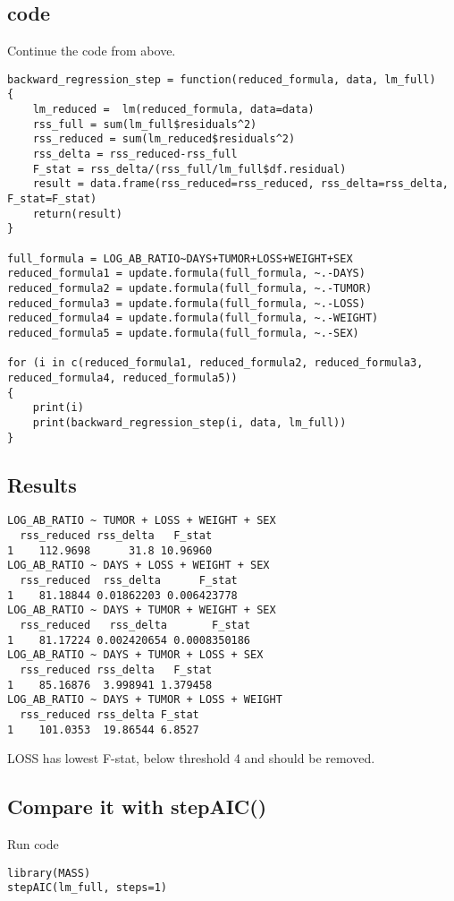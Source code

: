 \documentclass[a4paper,10pt]{article}
\begin{document}
\subsection{code}
Continue the code from above.
\begin{verbatim}
backward_regression_step = function(reduced_formula, data, lm_full)
{
	lm_reduced =  lm(reduced_formula, data=data)
	rss_full = sum(lm_full$residuals^2)
	rss_reduced = sum(lm_reduced$residuals^2)
	rss_delta = rss_reduced-rss_full
	F_stat = rss_delta/(rss_full/lm_full$df.residual)
	result = data.frame(rss_reduced=rss_reduced, rss_delta=rss_delta, F_stat=F_stat)
	return(result)
}

full_formula = LOG_AB_RATIO~DAYS+TUMOR+LOSS+WEIGHT+SEX
reduced_formula1 = update.formula(full_formula, ~.-DAYS)
reduced_formula2 = update.formula(full_formula, ~.-TUMOR)
reduced_formula3 = update.formula(full_formula, ~.-LOSS)
reduced_formula4 = update.formula(full_formula, ~.-WEIGHT)
reduced_formula5 = update.formula(full_formula, ~.-SEX)

for (i in c(reduced_formula1, reduced_formula2, reduced_formula3, reduced_formula4, reduced_formula5))
{
	print(i)
	print(backward_regression_step(i, data, lm_full))
}
\end{verbatim}

\subsection{Results}
\begin{verbatim}
LOG_AB_RATIO ~ TUMOR + LOSS + WEIGHT + SEX
  rss_reduced rss_delta   F_stat
1    112.9698      31.8 10.96960
LOG_AB_RATIO ~ DAYS + LOSS + WEIGHT + SEX
  rss_reduced  rss_delta      F_stat
1    81.18844 0.01862203 0.006423778
LOG_AB_RATIO ~ DAYS + TUMOR + WEIGHT + SEX
  rss_reduced   rss_delta       F_stat
1    81.17224 0.002420654 0.0008350186
LOG_AB_RATIO ~ DAYS + TUMOR + LOSS + SEX
  rss_reduced rss_delta   F_stat
1    85.16876  3.998941 1.379458
LOG_AB_RATIO ~ DAYS + TUMOR + LOSS + WEIGHT
  rss_reduced rss_delta F_stat
1    101.0353  19.86544 6.8527
\end{verbatim}
LOSS has lowest F-stat, below threshold 4 and should be removed.

\subsection{Compare it with stepAIC()}
Run code
\begin{verbatim}
library(MASS)
stepAIC(lm_full, steps=1)
\end{verbatim}
\end{document}
